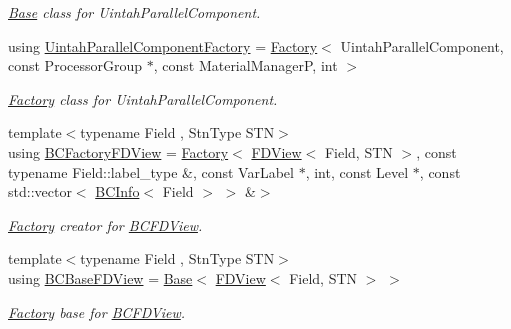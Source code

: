 \begin{DoxyCompactItemize}
\begin{DoxyCompactList}\small\item\em \hyperlink{classUintah_1_1PhaseField_1_1Base}{Base} class for Uintah\+Parallel\+Component. \end{DoxyCompactList}\item 
using \hyperlink{namespaceUintah_1_1PhaseField_aa9f0d6f6090c6c28bf051220734d61d6}{Uintah\+Parallel\+Component\+Factory} = \hyperlink{classUintah_1_1PhaseField_1_1Factory}{Factory}$<$ Uintah\+Parallel\+Component, const Processor\+Group $\ast$, const Material\+ManagerP, int $>$
\begin{DoxyCompactList}\small\item\em \hyperlink{classUintah_1_1PhaseField_1_1Factory}{Factory} class for Uintah\+Parallel\+Component. \end{DoxyCompactList}\item 
{\footnotesize template$<$typename Field , Stn\+Type S\+TN$>$ }\\using \hyperlink{namespaceUintah_1_1PhaseField_a27955353517b49f532c48918bdaa6e12}{B\+C\+Factory\+F\+D\+View} = \hyperlink{classUintah_1_1PhaseField_1_1Factory}{Factory}$<$ \hyperlink{namespaceUintah_1_1PhaseField_a63032464b1cd54eaa53c1c29109746ac}{F\+D\+View}$<$ Field, S\+TN $>$, const typename Field\+::label\+\_\+type \&, const Var\+Label $\ast$, int, const Level $\ast$, const std\+::vector$<$ \hyperlink{structUintah_1_1PhaseField_1_1BCInfo}{B\+C\+Info}$<$ Field $>$ $>$ \&$>$
\begin{DoxyCompactList}\small\item\em \hyperlink{classUintah_1_1PhaseField_1_1Factory}{Factory} creator for \hyperlink{classUintah_1_1PhaseField_1_1BCFDView}{B\+C\+F\+D\+View}. \end{DoxyCompactList}\item 
{\footnotesize template$<$typename Field , Stn\+Type S\+TN$>$ }\\using \hyperlink{namespaceUintah_1_1PhaseField_a0a0456c1a6ca9d0f48b97e8f4e13e6cc}{B\+C\+Base\+F\+D\+View} = \hyperlink{classUintah_1_1PhaseField_1_1Base}{Base}$<$ \hyperlink{namespaceUintah_1_1PhaseField_a63032464b1cd54eaa53c1c29109746ac}{F\+D\+View}$<$ Field, S\+TN $>$ $>$
\begin{DoxyCompactList}\small\item\em \hyperlink{classUintah_1_1PhaseField_1_1Factory}{Factory} base for \hyperlink{classUintah_1_1PhaseField_1_1BCFDView}{B\+C\+F\+D\+View}. \end{DoxyCompactList}\item 

\end{DoxyCompactItemize}
